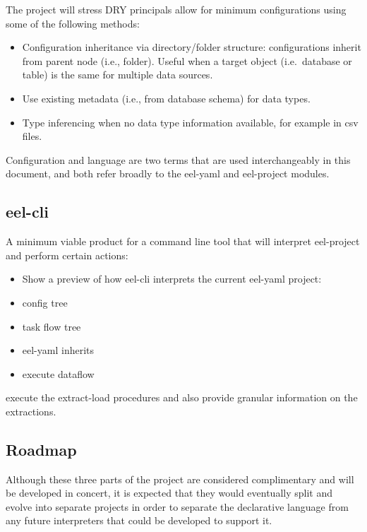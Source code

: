 The project will stress DRY principals allow for minimum configurations
using some of the following methods:

\begin{itemize}
\item
  Configuration inheritance via directory/folder structure:
  configurations inherit from parent node (i.e., folder). Useful when a
  target object (i.e.~database or table) is the same for multiple data
  sources.
\item
  Use existing metadata (i.e., from database schema) for data types.
\item
  Type inferencing when no data type information available, for example
  in csv files.
\end{itemize}

Configuration and language are two terms that are used interchangeably
in this document, and both refer broadly to the eel-yaml and eel-project
modules.

\subsection{eel-cli}\label{eel-cli}

A minimum viable product for a command line tool that will interpret
eel-project and perform certain actions:

\begin{itemize}
\item
  Show a preview of how eel-cli interprets the current eel-yaml project:
\item
  config tree
\item
  task flow tree
\item
  eel-yaml inherits
\item
  execute dataflow
\end{itemize}

execute the extract-load procedures and also provide granular
information on the extractions.

\subsection{Roadmap}\label{roadmap}

Although these three parts of the project are considered complimentary
and will be developed in concert, it is expected that they would
eventually split and evolve into separate projects in order to separate
the declarative language from any future interpreters that could be
developed to support it.
